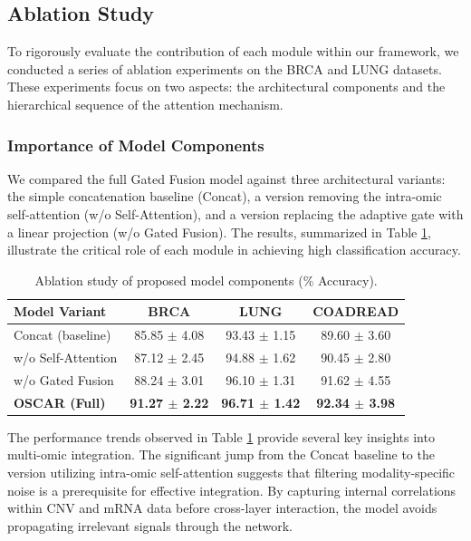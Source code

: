 \documentclass[lettersize,journal]{IEEEtran}
\begin{document}
\subsection{Ablation Study}


To rigorously evaluate the contribution of each module within our framework, we conducted a series of ablation experiments on the BRCA and LUNG datasets. These experiments focus on two aspects: the architectural components and the hierarchical sequence of the attention mechanism.

\subsubsection{Importance of Model Components}
We compared the full Gated Fusion model against three architectural variants: the simple concatenation baseline (Concat), a version removing the intra-omic self-attention (w/o Self-Attention), and a version replacing the adaptive gate with a linear projection (w/o Gated Fusion). The results, summarized in Table \ref{tab:ablation_components}, illustrate the critical role of each module in achieving high classification accuracy.


\begin{table}[!htbp]
\centering
\small
\caption{Ablation study of proposed model components (\% Accuracy).}
\label{tab:ablation_components}
\begin{tabular}{lccc}
\hline
\textbf{Model Variant} & \textbf{BRCA} & \textbf{LUNG} & \textbf{COADREAD} \\ \hline
Concat (baseline)      & 85.85 $\pm$ 4.08 & 93.43 $\pm$ 1.15 & 89.60 $\pm$ 3.60 \\
w/o Self-Attention     & 87.12 $\pm$ 2.45 & 94.88 $\pm$ 1.62 & 90.45 $\pm$ 2.80 \\
w/o Gated Fusion       & 88.24 $\pm$ 3.01 & 96.10 $\pm$ 1.31 & 91.62 $\pm$ 4.55 \\ \hline
\textbf{OSCAR (Full)} & \textbf{91.27 $\pm$ 2.22} & \textbf{96.71 $\pm$ 1.42} & \textbf{92.34 $\pm$ 3.98} \\ \hline
\end{tabular}
\end{table}

The performance trends observed in Table \ref{tab:ablation_components} provide several key insights into multi-omic integration. The significant jump from the Concat baseline to the version utilizing intra-omic self-attention suggests that filtering modality-specific noise is a prerequisite for effective integration. By capturing internal correlations within CNV and mRNA data before cross-layer interaction, the model avoids propagating irrelevant signals through the network. 
\end{document}
